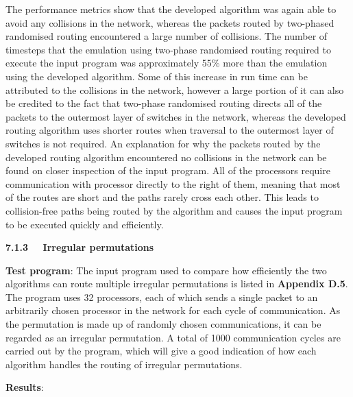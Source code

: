 \documentclass[a4paper, 12pt]{article}
\begin{document}
The performance metrics show that the developed algorithm was again able to avoid any collisions in the network, whereas the packets routed by two-phased randomised routing encountered a large number of collisions. The number of timesteps that the emulation using two-phase randomised routing required to execute the input program was approximately 55\% more than the emulation using the developed algorithm. Some of this increase in run time can be attributed to the collisions in the network, however a large portion of it can also be credited to the fact that two-phase randomised routing directs all of the packets to the outermost layer of switches in the network, whereas the developed routing algorithm uses shorter routes when traversal to the outermost layer of switches is not required. An explanation for why the packets routed by the developed routing algorithm encountered no collisions in the network can be found on closer inspection of the input program. All of the processors require communication with processor directly to the right of them, meaning that most of the routes are short and the paths rarely cross each other. This leads to collision-free paths being routed by the algorithm and causes the input program to be executed quickly and efficiently.

\noindent\textbf{7.1.3 \ \ Irregular permutations}

\noindent\textbf{Test program}: The input program used to compare how efficiently the two algorithms can route multiple irregular permutations is listed in \textbf{Appendix D.5}. The program uses 32 processors, each of which sends a single packet to an arbitrarily chosen processor in the network for each cycle of communication. As the permutation is made up of randomly chosen communications, it can be regarded as an irregular permutation. A total of 1000 communication cycles are carried out by the program, which will give a good indication of how each algorithm handles the routing of irregular permutations.

\noindent\textbf{Results}:
\end{document}
